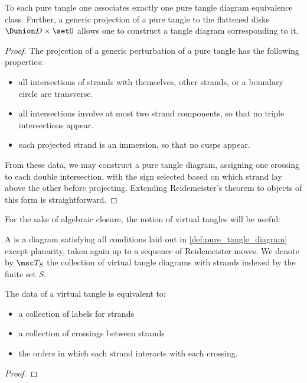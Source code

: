 \documentclass{article}
\begin{document}
\begin{theorem}\label{thm:pure_tangle}
        To each pure tangle one associates exactly one pure tangle diagram
        equivalence class. Further, a generic projection of a pure tangle to the
        flattened disks $\Dunion D\times\set0$ allows one to construct a tangle
        diagram corresponding to it.
\end{theorem}
\begin{proof}
        The projection of a generic perturbation of a pure tangle has the
        following properties:
        \begin{itemize}
                \item all intersections of strands with
                                themselves,
                                other strands, or
                                a boundary circle
                are transverse.
                \item all intersections involve at most two strand components,
                        so that no triple intersections appear.
                \item each projected strand is an immersion, so that no cusps
                        appear.
        \end{itemize}
        From these data, we may construct a pure tangle diagram, assigning one
        crossing to each double intersection, with the sign selected based on
        which strand lay above the other before projecting. Extending
        Reidemeister's theorem to objects of this form is straightforward.
\end{proof}

For the sake of algebraic closure, the notion of virtual tangles will be useful:
\begin{definition}
        A  is a diagram satisfying all conditions
        laid out in \cref{def:pure_tangle_diagram} except planarity, taken again
        up to a sequence of Reidemeister moves. We denote by $\tangle_S$ the
        collection of virtual tangle diagrams with strands indexed by the finite
        set $S$.
\end{definition}

\begin{theorem}
        The data of a virtual tangle is equivalent to:
        \begin{itemize}
                \item a collection of labels for strands
                \item a collection of crossings between strands
                \item the orders in which each strand interacts with each
                  crossing.
        \end{itemize}
\end{theorem}
\begin{proof}
        
\end{proof}
\end{document}
